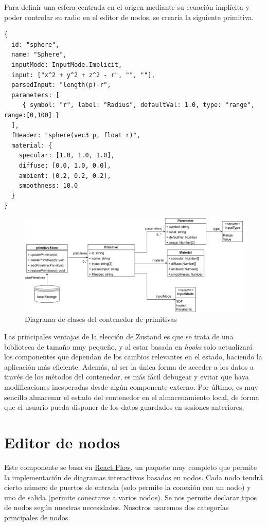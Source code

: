 \begin{ejemplo}
Para definir una esfera centrada en el origen mediante su ecuación implícita y poder controlar su radio en el editor de nodos, se crearía la siguiente primitiva.
\begin{lstlisting}
{
  id: "sphere",
  name: "Sphere",
  inputMode: InputMode.Implicit,
  input: ["x^2 + y^2 + z^2 - r", "", ""],
  parsedInput: "length(p)-r",
  parameters: [
     { symbol: "r", label: "Radius", defaultVal: 1.0, type: "range", range:[0,100] }
  ],
  fHeader: "sphere(vec3 p, float r)",
  material: {
    specular: [1.0, 1.0, 1.0],
    diffuse: [0.0, 1.0, 0.0],
    ambient: [0.2, 0.2, 0.2],
    smoothness: 10.0
  }
}
\end{lstlisting}
\end{ejemplo}

\begin{figure}[ht!]
    \centering
    \includegraphics[width=\textwidth]{Plantilla-TFG-master/img/diagramaZustand.png}
    \caption{Diagrama de clases del contenedor de primitivas}
    \label{fig:contenedorPrim}
\end{figure}

Las principales ventajas de la elección de Zustand es que se trata de una biblioteca de tamaño muy pequeño, y al estar basada en \textit{hooks} solo actualizará los componentes que dependan de los cambios relevantes en el estado, haciendo la aplicación más eficiente. Además, al ser la única forma de acceder a los datos a través de los métodos del contenedor, es más fácil debugear y evitar que haya modificaciones inesperadas desde algún componente externo. Por último, es muy sencillo almacenar el estado del contenedor en el almacenamiento local, de forma que el usuario pueda disponer de los datos guardados en sesiones anteriores.


\section{Editor de nodos}
Este componente se basa en \href{https://github.com/wbkd/react-flow}{React Flow}, un paquete muy completo que permite la implementación de diagramas interactivos basados en nodos. Cada nodo tendrá cierto número de puertos de entrada (solo permite la conexión con un nodo) y uno de salida (permite conectarse a varios nodos). Se nos permite declarar tipos de nodos según nuestras necesidades. Nosotros usaremos dos categorías principales de nodos.\newline

